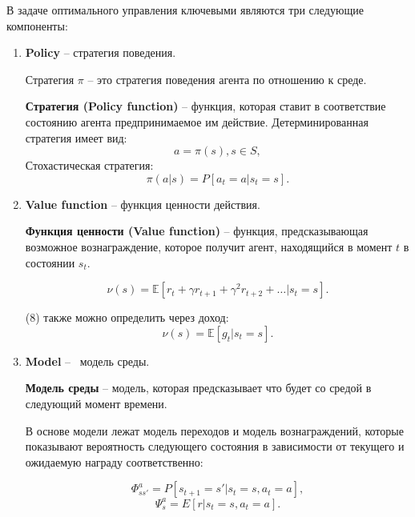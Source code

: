 В задаче оптимального управления ключевыми являются три следующие компоненты: 
\begin{enumerate}
    \item \textbf{Policy}  -- стратегия поведения.
    
    Стратегия $\pi$ -- это стратегия поведения агента по отношению к среде. 
    
    \textbf{Стратегия (Policy function) } – функция, которая ставит в соответствие состоянию агента предпринимаемое им действие. 
    Детерминированная стратегия имеет вид: 
    \begin{equation}
    	a = \pi(s), s \in S,
    \end{equation}
    Стохастическая стратегия:
    \begin{equation}
    	\pi(a|s) = P[a_t = a| s_t = s].
    \end{equation}

	\item \textbf{Value function} -- функция ценности действия.
    
    \textbf{Функция ценности (Value function)} –  функция, предсказывающая возможное вознаграждение, которое получит агент, находящийся в момент $t$ в состоянии $s_t$.
    
    \begin{equation}
    	\nu(s) = \mathbb{E} [ r_t + \gamma r_{t+1} + \gamma^2 r_{t+2} + \dots | s_t = s].
    \end{equation}
    
    (8) также можно определить через доход:
    \begin{equation}
    	\nu(s) = \mathbb{E}[g_t | s_t = s].
    \end{equation}
    
    \item\textbf{Model} --  модель среды.
    
    \textbf{Модель среды} –  модель, которая предсказывает что будет со средой в следующий момент времени.
    
    В основе модели лежат модель переходов и модель вознаграждений, которые показывают вероятность следующего состояния в зависимости от текущего и ожидаемую награду соответственно:
    
    $$\Phi_{ss'}^a = P[s_{t+1} = s'| s_t = s, a_t = a],$$
    $$\Psi_{s}^a = E[r| s_t = s, a_t = a].$$
    
\end{enumerate}




